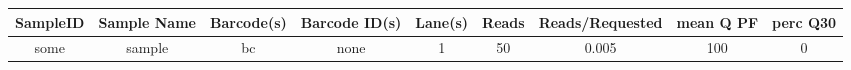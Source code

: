 \begin{center}
\begin{tabular}{|c | c | c | c | c | c | c | c | c |}
\hline
SampleID & Sample Name & Barcode(s) & Barcode ID(s) & Lane(s) & Reads & Reads/Requested & mean Q PF & perc Q30\\
\hline\hline
some & sample & bc & none & 1 & 50 & 0.005 & 100 & 0\\\hline
\end{tabular}
\end{center}